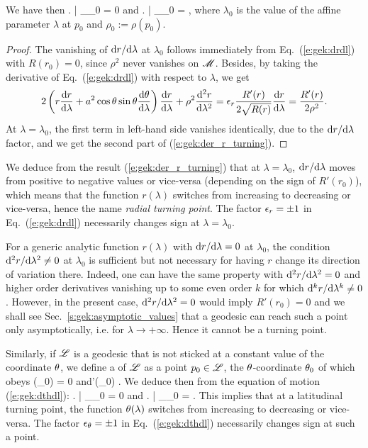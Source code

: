 We have then
\be \label{e:gek:der_r_turning}
   \left.  \right| _{\lambda_0} = 0
   \quad\mbox{and}\quad
   \left.  \right| _{\lambda_0} =   ,
\ee
where $\lambda_0$ is the value of the affine parameter $\lambda$ at $p_0$
and $\rho_0 := \rho(p_0)$.
\begin{proof}
The vanishing of $\mathrm{d} r/\mathrm{d}\lambda$ at $\lambda_0$ follows immediately
from Eq.~(\ref{e:gek:drdl}) with $R(r_0)=0$, since $\rho^2$ never vanishes
on $\mathscr{M}$. Besides, by
taking the derivative of Eq.~(\ref{e:gek:drdl}) with respect to $\lambda$, we
get
\[
    2 \left(r \frac{\mathrm{d} r}{\mathrm{d} \lambda} + a^2 \cos\theta\sin\theta \frac{\mathrm{d} \theta}{\mathrm{d} \lambda} \right)
    \frac{\mathrm{d} r}{\mathrm{d} \lambda} + \rho^2 \frac{\mathrm{d}^2 r}{\mathrm{d}\lambda^2} =
    \epsilon_r \frac{R'(r)}{2\sqrt{R(r)}} \frac{\mathrm{d} r}{\mathrm{d} \lambda} = \frac{R'(r)}{2\rho^2} .
\]
At $\lambda=\lambda_0$, the first term in left-hand side vanishes identically,
due to the $\mathrm{d} r/\mathrm{d}\lambda$ factor,
and we get the second part of (\ref{e:gek:der_r_turning}).
\end{proof}

We deduce from the result (\ref{e:gek:der_r_turning}) that at $\lambda=\lambda_0$,
$\mathrm{d} r/\mathrm{d}\lambda$ moves from positive to negative values or vice-versa
(depending on the sign of $R'(r_0)$), which means that the function $r(\lambda)$
switches from increasing to decreasing or vice-versa, hence the name \emph{radial
turning point}. The factor $\epsilon_r=\pm 1$ in Eq.~(\ref{e:gek:drdl}) necessarily
changes sign at $\lambda=\lambda_0$.

\begin{remark} \label{r:gek:der_r_analytic}
For a generic analytic function $r(\lambda)$ with $\mathrm{d} r/\mathrm{d} \lambda=0$ at
$\lambda_0$, the condition $\mathrm{d}^2 r/\mathrm{d}\lambda^2\neq 0$ at $\lambda_0$
is sufficient but not necessary for having $r$ change its direction of variation there.
Indeed, one can have the same property with $\mathrm{d}^2 r/\mathrm{d}\lambda^2= 0$ and higher order derivatives vanishing up to some even order $k$ for which
$\mathrm{d}^k r/\mathrm{d}\lambda^k\neq 0$. However, in the present case,
$\mathrm{d}^2 r/\mathrm{d}\lambda^2=0$ would imply $R'(r_0)=0$ and we shall see
Sec.~\ref{s:gek:asymptotic_values} that a geodesic can reach such a point only asymptotically,
i.e. for $\lambda\to +\infty$. Hence it cannot be a turning point.
\end{remark}


Similarly, if $\mathscr{L}$ is a geodesic that is not sticked at a constant value of the
coordinate $\theta$, we define a  of $\mathscr{L}$ as a point $p_0\in\mathscr{L}$, the
$\theta$-coordinate $\theta_0$ of which obeys
\be \label{e:gek:def_th_turning}
    \Theta(\th_0) = 0 \quad\mbox{and}\quad \Theta'(\theta_0)  .
\ee
We deduce then from the equation of motion (\ref{e:gek:dthdl}):
\be \label{e:gek:der_th_turning}
   \left. \derd{\th}{\lambda} \right| _{\lambda_0} = 0
   \quad\mbox{and}\quad
   \left.  \right| _{\lambda_0} =   .
\ee
This implies that at a latitudinal turning point, the function $\theta(\lambda)$
switches from increasing to decreasing or vice-versa. The factor $\epsilon_\theta=\pm 1$ in Eq.~(\ref{e:gek:dthdl}) necessarily
changes sign at such a point.

